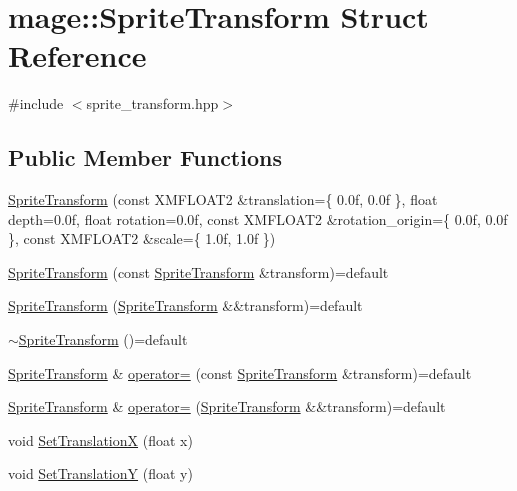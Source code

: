 \hypertarget{structmage_1_1_sprite_transform}{}\section{mage\+:\+:Sprite\+Transform Struct Reference}
\label{structmage_1_1_sprite_transform}


{\ttfamily \#include $<$sprite\+\_\+transform.\+hpp$>$}

\subsection*{Public Member Functions}
\begin{DoxyCompactItemize}
\item 
\hyperlink{structmage_1_1_sprite_transform_a60ab10912457ce7939c181fc67633fcf}{Sprite\+Transform} (const X\+M\+F\+L\+O\+A\+T2 \&translation=\{ 0.\+0f, 0.\+0f \}, float depth=0.\+0f, float rotation=0.\+0f, const X\+M\+F\+L\+O\+A\+T2 \&rotation\+\_\+origin=\{ 0.\+0f, 0.\+0f \}, const X\+M\+F\+L\+O\+A\+T2 \&scale=\{ 1.\+0f, 1.\+0f \})
\item 
\hyperlink{structmage_1_1_sprite_transform_a0126a3f6c7f486f10ec5d5ffd1180698}{Sprite\+Transform} (const \hyperlink{structmage_1_1_sprite_transform}{Sprite\+Transform} \&transform)=default
\item 
\hyperlink{structmage_1_1_sprite_transform_a53d7da4498f4f9f67be2994eb4593c3a}{Sprite\+Transform} (\hyperlink{structmage_1_1_sprite_transform}{Sprite\+Transform} \&\&transform)=default
\item 
\hyperlink{structmage_1_1_sprite_transform_a14a3614023996cbb071c3de99f9528bc}{$\sim$\+Sprite\+Transform} ()=default
\item 
\hyperlink{structmage_1_1_sprite_transform}{Sprite\+Transform} \& \hyperlink{structmage_1_1_sprite_transform_af0adccff92d48e7b347e66277981ee07}{operator=} (const \hyperlink{structmage_1_1_sprite_transform}{Sprite\+Transform} \&transform)=default
\item 
\hyperlink{structmage_1_1_sprite_transform}{Sprite\+Transform} \& \hyperlink{structmage_1_1_sprite_transform_a9278d3fd0a6d346b188515b67a1adfc2}{operator=} (\hyperlink{structmage_1_1_sprite_transform}{Sprite\+Transform} \&\&transform)=default
\item 
void \hyperlink{structmage_1_1_sprite_transform_a59f5300f046b73c958084977158ed789}{Set\+TranslationX} (float x)
\item 
void \hyperlink{structmage_1_1_sprite_transform_a52a07a3c3d9f65a33bc658208cd40444}{Set\+TranslationY} (float y)

\end{DoxyCompactItemize}
